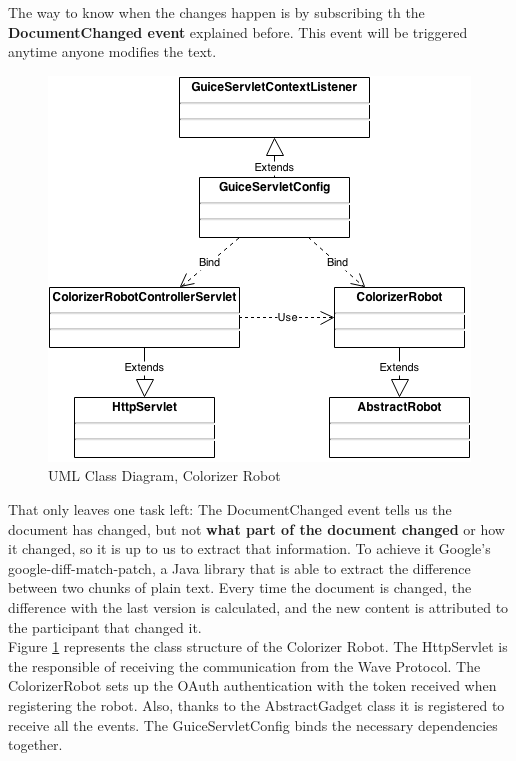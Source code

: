 The way to know when the changes happen is by subscribing th the \textbf{DocumentChanged event} explained before. This event will be triggered anytime anyone modifies the text.\\[.2cm]
\begin{figure}[h]
  \center
    \includegraphics[keepaspectratio, scale=0.5]{Media/Diagrams/Robot/Colorizer.png}
  \caption{UML Class Diagram, Colorizer Robot}
  \label{fig:colorizer_diagram}
\end{figure}
That only leaves one task left: The DocumentChanged event tells us the document has changed, but not \textbf{what part of the document changed} or how it changed, so it is up to us to extract that information. To achieve it Google's google-diff-match-patch, a Java library that is able to extract the difference between two chunks of plain text. Every time the document is changed, the difference with the last version is calculated, and the new content is attributed to the participant that changed it.\\[.2cm]
Figure \ref{fig:colorizer_diagram} represents the class structure of the Colorizer Robot. The HttpServlet is the responsible of receiving the communication from the Wave Protocol. The ColorizerRobot sets up the OAuth authentication with the token received when registering the robot. Also, thanks to the AbstractGadget class it is registered to receive all the events. The GuiceServletConfig binds the necessary dependencies together.
